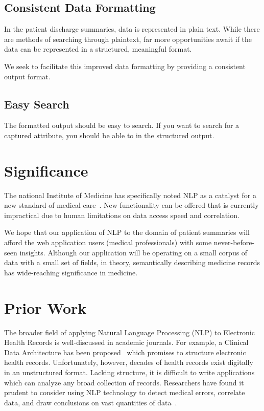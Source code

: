 \documentclass{acm_proc_article-sp}
\begin{document}
\subsection{Consistent Data Formatting}
In the patient discharge summaries, data is represented in plain text. While there are methods of
searching through plaintext, far more opportunities await if the data can be represented in a 
structured, meaningful format.

We seek to facilitate this improved data formatting by providing a consistent output format.
\subsection{Easy Search}
The formatted output should be easy to search. If you want to search for a captured attribute,
you should be able to in the structured output.

\section{Significance}
The national Institute of Medicine has specifically noted NLP as a catalyst for a new
standard of medical care~\cite{friedman}. New functionality can be offered that is currently
impractical due to human limitations on data access speed and correlation.

We hope that our application of NLP to the domain of patient summaries will afford the
web application users (medical professionals) with some never-before-seen insights.
Although our application will be operating on a small corpus of data with a small set 
of fields, in theory, semantically describing medicine records has wide-reaching 
significance in medicine.

\section{Prior Work}
The broader field of applying Natural Language Processing (NLP) to Electronic Health Records
is well-discussed in academic journals. For example, a Clinical Data Architecture has been
proposed~\cite{CDA} which promises to structure electronic health records. Unfortunately, however,
decades of health records exist digitally in an unstructured format. Lacking structure, it is
difficult to write applications which can analyze any broad collection of records. Researchers
have found it prudent to consider using NLP technology to detect medical errors, correlate data, 
and draw conclusions on vast quantities of data~\cite{friedman}.
\end{document}
